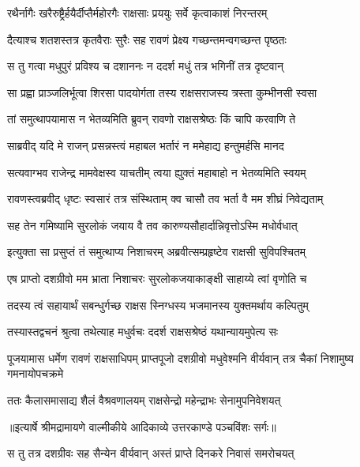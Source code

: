 \twolineshloka
{रथैर्नागैः खरैरुष्ट्रैर्हयैर्दीप्तैर्महोरगैः}
{राक्षसाः प्रययुः सर्वे कृत्वाकाशं निरन्तरम्} %

\twolineshloka
{दैत्याश्च शतशस्तत्र कृतवैराः सुरैः सह}
{रावणं प्रेक्ष्य गच्छन्तमन्वगच्छन्त पृष्ठतः} %

\twolineshloka
{स तु गत्वा मधुपुरं प्रविश्य च दशाननः}
{न ददर्श मधुं तत्र भगिनीं तत्र दृष्टवान्} %

\twolineshloka
{सा प्रह्वा प्राञ्जलिर्भूत्वा शिरसा पादयोर्गता}
{तस्य राक्षसराजस्य त्रस्ता कुम्भीनसी स्वसा} %

\twolineshloka
{तां समुत्थापयामास न भेतव्यमिति ब्रुवन्}
{रावणो राक्षसश्रेष्ठः किं चापि करवाणि ते} %

\twolineshloka
{साब्रवीद् यदि मे राजन् प्रसन्नस्त्वं महाबल}
{भर्तारं न ममेहाद्य हन्तुमर्हसि मानद} %

\twolineshloka
{सत्यवाग्भव राजेन्द्र मामवेक्षस्व याचतीम्}
{त्वया ह्युक्तं महाबाहो न भेतव्यमिति स्वयम्} %

\twolineshloka
{रावणस्त्वब्रवीद् धृष्टः स्वसारं तत्र संस्थिताम्}
{क्व चासौ तव भर्ता वै मम शीघ्रं निवेद्यताम्} %

\twolineshloka
{सह तेन गमिष्यामि सुरलोकं जयाय वै}
{तव कारुण्यसौहार्दान्निवृत्तोऽस्मि मधोर्वधात्} %

\twolineshloka
{इत्युक्ता सा प्रसुप्तं तं समुत्थाप्य निशाचरम्}
{अब्रवीत्सम्प्रहृष्टेव राक्षसी सुविपश्चितम्} %

\twolineshloka
{एष प्राप्तो दशग्रीवो मम भ्राता निशाचरः}
{सुरलोकजयाकाङ्क्षी साहाय्ये त्वां वृणोति च} %

\twolineshloka
{तदस्य त्वं सहायार्थं सबन्धुर्गच्छ राक्षस}
{स्निग्धस्य भजमानस्य युक्तमर्थाय कल्पितुम्} %

\twolineshloka
{तस्यास्तद्वचनं श्रुत्वा तथेत्याह मधुर्वचः}
{ददर्श राक्षसश्रेष्ठं यथान्यायमुपेत्य सः} %

\threelineshloka
{पूजयामास धर्मेण रावणं राक्षसाधिपम्}
{प्राप्तपूजो दशग्रीवो मधुवेश्मनि वीर्यवान्}
{तत्र चैकां निशामुष्य गमनायोपचक्रमे} %

\twolineshloka
{ततः कैलासमासाद्य शैलं वैश्रवणालयम्}
{राक्षसेन्द्रो महेन्द्राभः सेनामुपनिवेशयत्} %


{॥इत्यार्षे श्रीमद्रामायणे वाल्मीकीये आदिकाव्ये उत्तरकाण्डे पञ्चविंशः सर्गः॥}


\twolineshloka
{स तु तत्र दशग्रीवः सह सैन्येन वीर्यवान्}
{अस्तं प्राप्ते दिनकरे निवासं समरोचयत्} %

